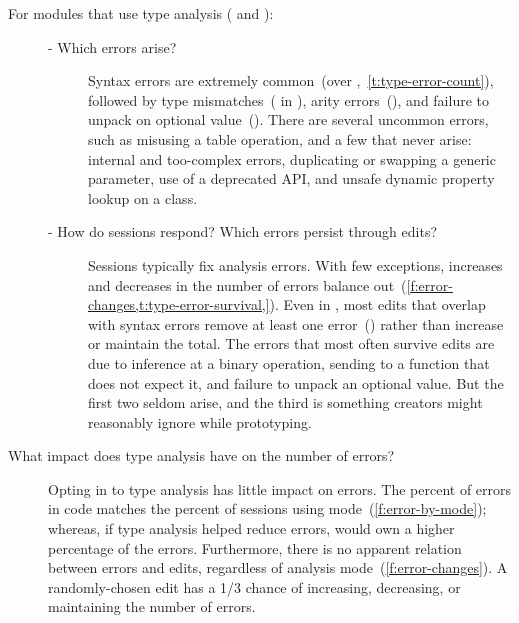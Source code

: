 \documentclass[english,submission,cleveref]{programming}
\begin{document}
\begin{description}
  \item[For modules that use type analysis (\mstrict{} and \mnonstrict{}):]\leavevmode
    \begin{description}
      \item[- Which errors arise?]
        Syntax errors are extremely common~(over ,~\cref{t:type-error-count}), 
        followed by type mismatches~( in \mstrict{}),
        arity errors~(),
        and failure to unpack on optional value~().
        There are several uncommon errors, such as misusing a table operation,
        and a few that never arise: internal and too-complex errors,
        duplicating or swapping a generic parameter, use of a deprecated API,
        and unsafe dynamic property lookup on a class.

      \item[- How do sessions respond? Which errors persist through edits?]
        Sessions typically fix analysis errors.
        With few exceptions, increases and decreases in the number of errors
        balance out~(\cref{f:error-changes,t:type-error-survival,}).
        Even in \mnocheck{}, most edits that overlap with syntax errors
        remove at least one error~() rather than increase or maintain
        the total.
        The errors that most often survive edits are due to
        inference at a binary operation,
        sending  to a function that does not expect it,
        and failure to unpack an optional value.
        But the first two seldom arise, and the third is something creators
        might reasonably ignore while prototyping.


    \end{description}

  \item[What impact does type analysis have on the number of \FS{} errors?]
    Opting in to type analysis has little impact on \FS{} errors.
    The percent of \FS{} errors in \mnocheck{} code matches the percent of
    sessions using \mnocheck{} mode~(\cref{f:error-by-mode}); whereas,
    if type analysis helped reduce \FS{} errors, \mnocheck{} would own a
    higher percentage of the errors.
    Furthermore, there is no apparent relation between \FS{} errors and edits,
    regardless of analysis mode~(\cref{f:error-changes}).
    A randomly-chosen edit has a 1/3 chance of increasing, decreasing, or
    maintaining the number of \FS{} errors.

\end{description}
\end{document}
